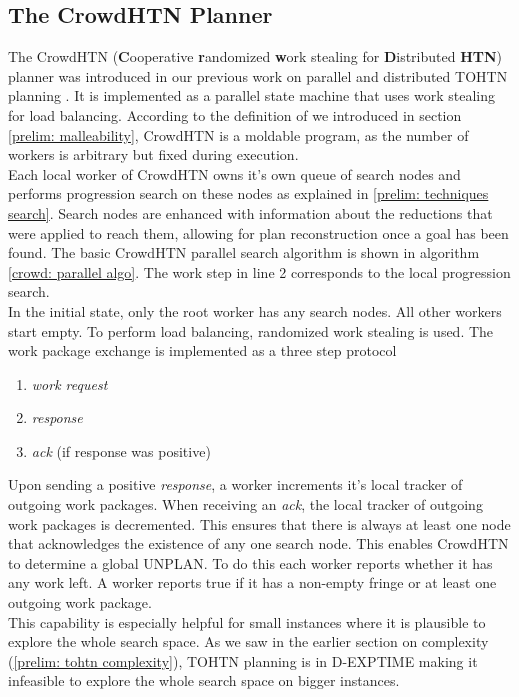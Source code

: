 \subsection{The CrowdHTN Planner}
\label{prelim: crowdhtn}
The CrowdHTN (\textbf{C}ooperative \textbf{r}andomized \textbf{w}ork stealing for \textbf{D}istributed \textbf{HTN}) planner was introduced in our previous work on parallel and distributed TOHTN planning \cite{bretl2021parallel}. It is implemented as a parallel state machine that uses work stealing for load balancing. According to the definition of \cite{feitelson1997job} we introduced in section \ref{prelim: malleability}, CrowdHTN is a moldable program, as the number of workers is arbitrary but fixed during execution. \\
Each local worker of CrowdHTN owns it's own queue of search nodes and performs progression search on these nodes as explained in \ref{prelim: techniques search}. Search nodes are enhanced with information about the reductions that were applied to reach them, allowing for plan reconstruction once a goal has been found. The basic CrowdHTN parallel search algorithm is shown in algorithm \ref{crowd: parallel algo}. The work step in line 2 corresponds to the local progression search. \\
In the initial state, only the root worker has any search nodes. All other workers start empty. To perform load balancing, randomized work stealing is used. The work package exchange is implemented as a three step protocol
\begin{enumerate}
	\item \textit{work request}
	\item \textit{response}
	\item \textit{ack} (if response was positive)
\end{enumerate}
Upon sending a positive \textit{response}, a worker increments it's local tracker of outgoing work packages. When receiving an \textit{ack}, the local tracker of outgoing work packages is decremented. This ensures that there is always at least one node that acknowledges the existence of any one search node. This enables CrowdHTN to determine a global UNPLAN. To do this each worker reports whether it has any work left. A worker reports true if it has a non-empty fringe or at least one outgoing work package. \\
This capability is especially helpful for small instances where it is plausible to explore the whole search space. As we saw in the earlier section on complexity (\ref{prelim: tohtn complexity}), TOHTN planning is in D-EXPTIME making it infeasible to explore the whole search space on bigger instances.\\
